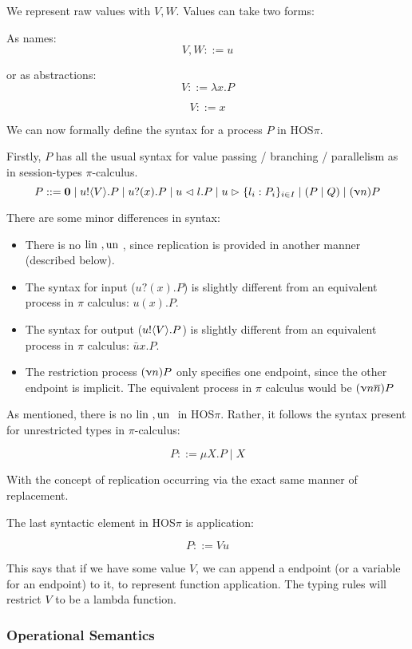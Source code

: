 We represent raw values with $V,W$. Values can take two forms:

As names:
$$
V, W ::= u
$$

or as abstractions:
$$
V ::= \lambda x . P
$$

$$
V ::= x
$$

We can now formally define the syntax for a process $P$ in HOS$\pi$.

Firstly, $P$ has all the usual syntax for value passing / branching / parallelism as in session-types $\pi$-calculus.
$$
P ::= \textbf{0} \mid u!\langle V \rangle.P \mid u?(x).P \mid u \vartriangleleft l.P \mid u \vartriangleright \{l_i : P_i\}_{i \in I} \mid (P \mid Q)  \mid (\upnu n) P
$$

There are some minor differences in syntax:
\begin{itemize}
    \item There is no $\text{lin }, \text{un }$, since replication is provided in another manner (described below).
    \item The syntax for input ($u ? (x) . P$) is slightly different from an equivalent process in $\pi$ calculus: $u(x) . P$.
    \item The syntax for output ($u! \langle V \rangle.P$) is slightly different from an equivalent process in $\pi$ calculus: $\bar{u}x.P$.
    \item The restriction process $(\upnu n) P$ only specifies one endpoint, since the other endpoint is implicit. The equivalent process in $\pi$ calculus would be $(\upnu n \overline{n}) P$
\end{itemize}

As mentioned, there is no $\text{lin }, \text{un }$ in HOS$\pi$. Rather, it follows the syntax present for unrestricted types in $\pi$-calculus:

$$
P ::= \mu X . P \mid X
$$

With the concept of replication occurring via the exact same manner of replacement.

The last syntactic element in HOS$\pi$ is application:

$$
P ::= V u
$$

This says that if we have some value $V$, we can append a endpoint (or a variable for an endpoint) to it, to represent function application. The typing rules will restrict $V$ to be a lambda function.



\subsubsection{Operational Semantics}


